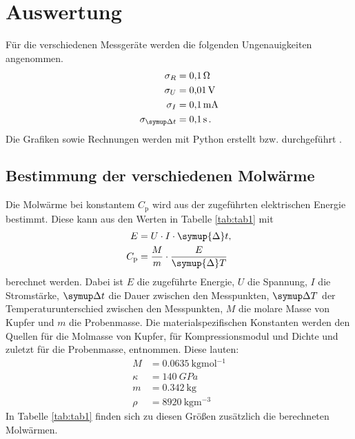 \section{Auswertung}
\label{sec:Auswertung}
Für die verschiedenen Messgeräte werden die folgenden Ungenauigkeiten angenommen.
\begin{align*}
	\sigma_R &= \SI{0.1}{\ohm}\\
	\sigma_U &= \SI{0.01}{\volt}\\
	\sigma_I &= \SI{0.1}{\milli\ampere}\\
	\sigma_{\symup\Delta t} &= \SI{0.1}{\second}	\,\text.
\end{align*}
Die Grafiken sowie Rechnungen werden mit Python erstellt bzw. durchgeführt \cite{python}.
\subsection{Bestimmung der verschiedenen Molwärme}
Die Molwärme bei konstantem $C_\mathrm{p}$ wird aus der zugeführten elektrischen Energie bestimmt.
Diese kann aus den Werten in Tabelle \ref{tab:tab1} mit
\begin{align}
	E &= U \cdot I \cdot \symup{\Delta} t,\\
	C_\mathrm{p} &= \frac{M}{m}\cdot\frac{E}{\symup{\Delta} T}
	\label{eqn:cp}
\end{align}
berechnet werden.
Dabei ist $E$ die zugeführte Energie, $U$ die Spannung, $I$ die Stromstärke, $\symup\Delta t$ die Dauer zwischen den Messpunkten, $\symup\Delta T$ der Temperaturunterschied zwischen den Messpunkten, $M$ die molare Masse von Kupfer und $m$ die Probenmasse. Die materialspezifischen Konstanten werden den Quellen \cite{Anleitung4} für die Molmasse von Kupfer, \cite{Anleitung5} für Kompressionsmodul und Dichte und zuletzt \cite[4]{Anleitung} für die Probenmasse, entnommen. Diese lauten:
\begin{align*}
  M &= \SI{0.0635}{\kilo\gram\mol^{-1}} \\
  \kappa &= \SI{140}{GPa} \\
  m &= \SI{0.342}{\kilo\gram} \\
  \rho &= \SI{8920}{\kilo\gram\meter^{-3}}
\end{align*}
In Tabelle \ref{tab:tab1} finden sich zu diesen Größen zusätzlich die berechneten Molwärmen.
